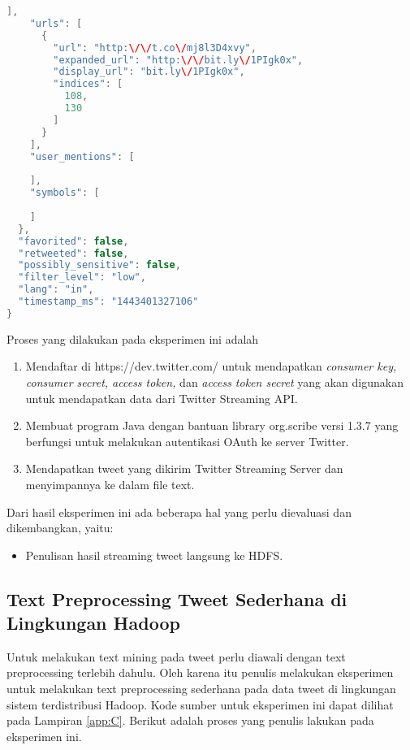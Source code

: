 \begin{lstlisting}[language=Java,basicstyle=\tiny,caption=Hasil Streaming]
    ],
    "urls": [
      {
        "url": "http:\/\/t.co\/mj8l3D4xvy",
        "expanded_url": "http:\/\/bit.ly\/1PIgk0x",
        "display_url": "bit.ly\/1PIgk0x",
        "indices": [
          108,
          130
        ]
      }
    ],
    "user_mentions": [
      
    ],
    "symbols": [
      
    ]
  },
  "favorited": false,
  "retweeted": false,
  "possibly_sensitive": false,
  "filter_level": "low",
  "lang": "in",
  "timestamp_ms": "1443401327106"
}
\end{lstlisting}

Proses yang dilakukan pada eksperimen ini adalah
\begin{enumerate}
	\item Mendaftar di https://dev.twitter.com/ untuk mendapatkan \textit{consumer key,  consumer secret, access token,} dan \textit{access token secret} yang akan digunakan untuk mendapatkan data dari Twitter Streaming API.
	\item Membuat program Java dengan bantuan library org.scribe versi 1.3.7 yang berfungsi untuk melakukan autentikasi OAuth ke server Twitter.
	\item Mendapatkan tweet yang dikirim Twitter Streaming Server dan menyimpannya ke dalam file text.
\end{enumerate}
 
Dari hasil eksperimen ini ada beberapa hal yang perlu dievaluasi dan dikembangkan, yaitu:

\begin{itemize}
	\item Penulisan hasil streaming tweet langsung ke HDFS.
\end{itemize}


\subsection{Text Preprocessing Tweet Sederhana di Lingkungan Hadoop}
Untuk melakukan text mining pada tweet perlu diawali dengan text preprocessing terlebih dahulu. Oleh karena itu penulis melakukan eksperimen untuk melakukan text preprocessing sederhana pada data tweet di lingkungan sistem terdistribusi Hadoop. Kode sumber untuk eksperimen ini dapat dilihat pada Lampiran \ref{app:C}. Berikut adalah proses yang penulis lakukan pada eksperimen ini.

